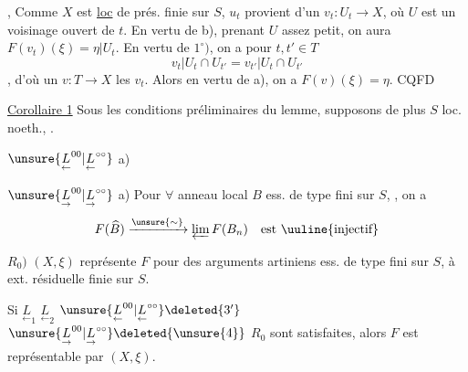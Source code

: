 , Comme $X$ est \uline{loc} de prés. finie sur $S$, $u_t$ provient d'un $v_t:U_t\to X$, où $U$ est un voisinage ouvert de $t$. En vertu de b), prenant $U$ assez petit, on aura $F(v_t)(\xi)=\eta|U_t$.
En vertu de $1^\circ)$, on a pour $t,t'\in T$
\[
v_t|U_t\cap U_{t'}=v_{t'}|U_t\cap U_{t'}
\]
, d'où un $v:T\to X$   les $v_t$.
Alors en vertu de a), on a $F(v)(\xi)=\eta$.
\hfill CQFD

\uline{Corollaire 1} Sous les conditions préliminaires du lemme, supposons de plus $S$ loc. noeth.,
 .

$\unsure{\underset{\leftarrow}{L}^{00}|\underset{\leftarrow}{L}^{\circ\circ}}$ a) 

$\unsure{\underset{\rightarrow}{L}^{00}|\underset{\rightarrow}{L}^{\circ\circ}}$ a)  Pour $\forall$ anneau local $B$ ess. de type fini sur $S$, , on a
\[
F(\widehat B)\xrightarrow{\unsure{\sim}}\varprojlim F(B_n)\quad\text{est \uuline{injectif}}
\]

$R_0)$ $(X,\xi)$ représente $F$ pour des arguments artiniens ess. de type fini sur $S$, à ext. résiduelle finie sur $S$.

Si $\underset{\leftarrow}{L}_1$ $\underset{\leftarrow}{L}_2$ $\unsure{\underset{\leftarrow}{L}^{00}|\underset{\leftarrow}{L}^{\circ\circ}}\deleted{3'}$ $\unsure{\underset{\rightarrow}{L}^{00}|\underset{\rightarrow}{L}^{\circ\circ}}\deleted{\unsure{4}}$ $R_0$ sont satisfaites, alors $F$ est représentable par $(X,\xi)$.
